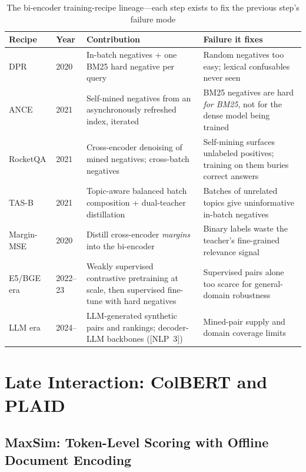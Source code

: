 \begin{table}[H]
\centering
\small
\caption{The bi-encoder training-recipe lineage---each step exists to fix the previous step's failure mode}
\label{sr:tab:recipe_lineage}
\begin{tabularx}{\textwidth}{llXX}
\toprule
\textbf{Recipe} & \textbf{Year} & \textbf{Contribution} & \textbf{Failure it fixes} \\
\midrule
DPR & 2020 & In-batch negatives + one BM25 hard negative per query & Random negatives too easy; lexical confusables never seen \\
ANCE & 2021 & Self-mined negatives from an asynchronously refreshed index, iterated & BM25 negatives are hard \textit{for BM25}, not for the dense model being trained \\
RocketQA & 2021 & Cross-encoder denoising of mined negatives; cross-batch negatives & Self-mining surfaces unlabeled positives; training on them buries correct answers \\
TAS-B & 2021 & Topic-aware balanced batch composition + dual-teacher distillation & Batches of unrelated topics give uninformative in-batch negatives \\
Margin-MSE & 2020 & Distill cross-encoder \textit{margins} into the bi-encoder & Binary labels waste the teacher's fine-grained relevance signal \\
E5/BGE era & 2022--23 & Weakly supervised contrastive pretraining at scale, then supervised fine-tune with hard negatives & Supervised pairs alone too scarce for general-domain robustness \\
LLM era & 2024-- & LLM-generated synthetic pairs and rankings; decoder-LLM backbones ([NLP~3]) & Mined-pair supply and domain coverage limits \\
\bottomrule
\end{tabularx}
\end{table}

\section{Late Interaction: ColBERT and PLAID}
\label{sr:sec:late_interaction}

\subsection{MaxSim: Token-Level Scoring with Offline Document Encoding}

